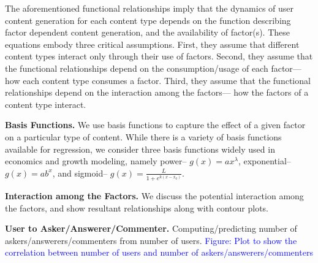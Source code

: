The aforementioned functional relationships imply that the dynamics of user content generation for each content type depends on the function describing factor dependent content generation, and the availability of factor(s). These equations embody three critical assumptions. First, they assume that different content types interact only through their use of factors. Second, they assume that the functional relationships depend on the consumption/usage of each factor--- how each content type consumes a factor. Third, they assume that the functional relationships depend on the interaction among the factors--- how the factors of a content type interact.

\textbf{Basis Functions.} We use basis functions to capture the effect of a given factor on a particular type of content. While there is a variety of basis functions available for regression, we consider three basis functions widely used in economics and growth modeling, namely power-- $g(x) = ax^{\lambda}$, exponential-- $g(x) = ab^x$, and sigmoid-- $g(x) = \frac{L}{1+e^{k(x-x_0)}}$. 

\textbf{Interaction among the Factors.} We discuss the potential interaction among the factors, and show resultant relationships along with contour plots. 

\textbf{User to Asker/Answerer/Commenter.} Computing/predicting number of askers/answerers/commenters from number of users. \textcolor{blue}{Figure: Plot to show the correlation between number of users and number of askers/answerers/commenters}



